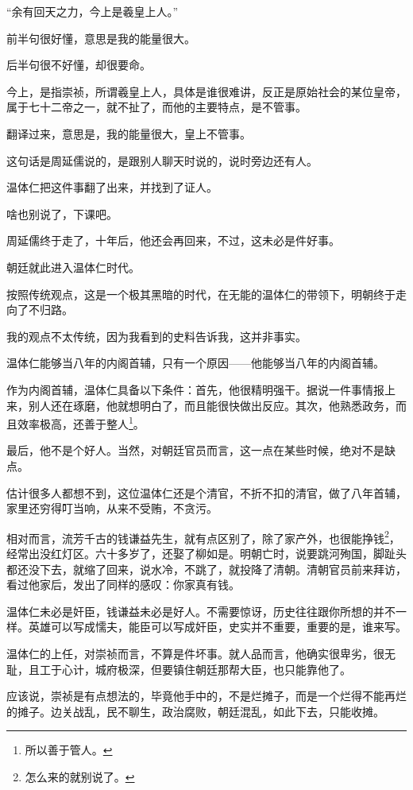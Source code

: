 \begin{multicols}{\theparacolNo}
		“余有回天之力，今上是羲皇上人。”

		前半句很好懂，意思是我的能量很大。

		后半句很不好懂，却很要命。

		今上，是指崇祯，所谓羲皇上人，具体是谁很难讲，反正是原始社会的某位皇帝，属于七十二帝之一，就不扯了，而他的主要特点，是不管事。

		翻译过来，意思是，我的能量很大，皇上不管事。

		这句话是周延儒说的，是跟别人聊天时说的，说时旁边还有人。

		温体仁把这件事翻了出来，并找到了证人。

		啥也别说了，下课吧。

		周延儒终于走了，十年后，他还会再回来，不过，这未必是件好事。

		朝廷就此进入温体仁时代。

		按照传统观点，这是一个极其黑暗的时代，在无能的温体仁的带领下，明朝终于走向了不归路。

		我的观点不太传统，因为我看到的史料告诉我，这并非事实。

		温体仁能够当八年的内阁首辅，只有一个原因——他能够当八年的内阁首辅。

		作为内阁首辅，温体仁具备以下条件：首先，他很精明强干。据说一件事情报上来，别人还在琢磨，他就想明白了，而且能很快做出反应。其次，他熟悉政务，而且效率极高，还善于整人\footnote{所以善于管人。}。

		最后，他不是个好人。当然，对朝廷官员而言，这一点在某些时候，绝对不是缺点。

		估计很多人都想不到，这位温体仁还是个清官，不折不扣的清官，做了八年首辅，家里还穷得叮当响，从来不受贿，不贪污。

		相对而言，流芳千古的钱谦益先生，就有点区别了，除了家产外，也很能挣钱\footnote{怎么来的就别说了。}，经常出没红灯区。六十多岁了，还娶了柳如是。明朝亡时，说要跳河殉国，脚趾头都还没下去，就缩了回来，说水冷，不跳了，就投降了清朝。清朝官员前来拜访，看过他家后，发出了同样的感叹：你家真有钱。

		温体仁未必是奸臣，钱谦益未必是好人。不需要惊讶，历史往往跟你所想的并不一样。英雄可以写成懦夫，能臣可以写成奸臣，史实并不重要，重要的是，谁来写。

		温体仁的上任，对崇祯而言，不算是件坏事。就人品而言，他确实很卑劣，很无耻，且工于心计，城府极深，但要镇住朝廷那帮大臣，也只能靠他了。

		应该说，崇祯是有点想法的，毕竟他手中的，不是烂摊子，而是一个烂得不能再烂的摊子。边关战乱，民不聊生，政治腐败，朝廷混乱，如此下去，只能收摊。


\end{multicols}
